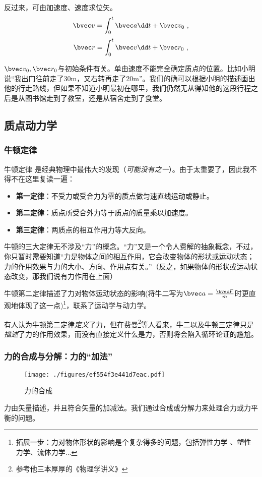反过来，可由加速度、速度求位矢。
$$
\bvec v = \int^{t}_0\bvec a \dd t + \bvec v_0~,
$$
$$
\bvec r = \int^{t}_0\bvec v \dd t + \bvec r_0~,
$$

$\bvec v_0, \bvec r_0$与初始条件有关。单由速度不能完全确定质点的位置。比如小明说“我出门往前走了30m，又右转再走了20m”。我们的确可以根据小明的描述画出他的行走路线，但如果不知道小明最初在哪里，我们仍然无从得知他的这段行程之后是从图书馆走到了教室，还是从宿舍走到了食堂。

\subsection{质点动力学}

\subsubsection{牛顿定律}
牛顿定律 是经典物理中最伟大的发现（\textsl{可能没有之一}）。由于太重要了，因此我不得不在这里复读一遍：

\begin{itemize}
\item \textbf{第一定律}：不受力或受合力为零的质点做匀速直线运动或静止。
\item \textbf{第二定律}：质点所受合外力等于质点的质量乘以加速度。
\item \textbf{第三定律}：两质点的相互作用力等大反向。
\end{itemize}

牛顿的三大定律无不涉及“力”的概念。“力”又是一个令人费解的抽象概念，不过，你只暂时需要知道“力是物体之间的相互作用，它会改变物体的形状或运动状态；力的作用效果与力的大小、方向、作用点有关。”（反之，如果物体的形状或运动状态改变，那我们说有力作用在上面）

牛顿第二定律描述了力对物体运动状态的影响(将牛二写为$\bvec a = \frac{\bvec F}{m}$时更直观地体现了这一点)\footnote{拓展一步：力对物体形状的影响是个复杂得多的问题，包括弹性力学 、塑性力学、流体力学...}，联系了运动学与动力学。

有人认为牛顿第二定律\textsl{定义}了力，但在费曼\footnote{参考他三本厚厚的《物理学讲义》}等人看来，牛二以及牛顿三定律只是\textsl{描述}了力的作用效果，而没有直接定义什么是力，否则将会陷入循环论证的尴尬。

\subsubsection{力的合成与分解：力的“加法”}
\begin{figure}[ht]
\centering
\texttt{[image: ./figures/ef554f3e441d7eac.pdf]}
\caption{力的合成} \label{fig_MPAB_4}
\end{figure}
力由矢量描述，并且符合矢量的加减法。我们通过合成或分解力来处理合力或力平衡的问题。

